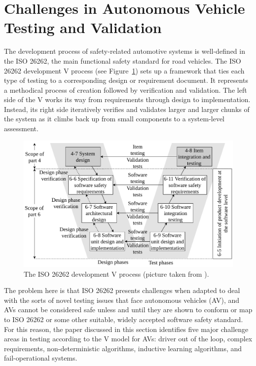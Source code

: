 \documentclass[a4paper, 10pt]{article}
\begin{document}
\section{Challenges in Autonomous Vehicle Testing and Validation~\cite{challenges}}
The development process of safety-related automotive systems is well-defined in the ISO 26262, the main functional safety standard for road vehicles. The ISO 26262 development V process (see Figure~\ref{fig:v}) sets up a framework that ties each type of testing to a corresponding design or requirement document. It represents a methodical process of creation followed by verification and validation. The left side of the V works its way from requirements through design to implementation. Instead, its right side iteratively verifies and validates larger and larger chunks of the system as it climbs back up from small components to a system-level assessment. 
\begin{figure}[htbp]
	\centering
	\includegraphics[width=0.7\linewidth]{figures/Part6development.pdf}
	\caption{The ISO 26262 development V process (picture taken from \cite{En-Route:SAC2020}).}
	\label{fig:v}
\end{figure}

The problem here is that ISO 26262 presents challenges when adapted to deal with the sorts of novel testing issues that face autonomous vehicles (AV), and AVs cannot be considered safe unless and until they are shown to conform or map to ISO 26262 or some other suitable, widely accepted software safety standard. For this reason, the paper discussed in this section identifies five major challenge areas in testing according to the V model for AVs: driver out of the loop, complex requirements, non-deterministic algorithms, inductive learning algorithms, and fail-operational systems. %
\end{document}
